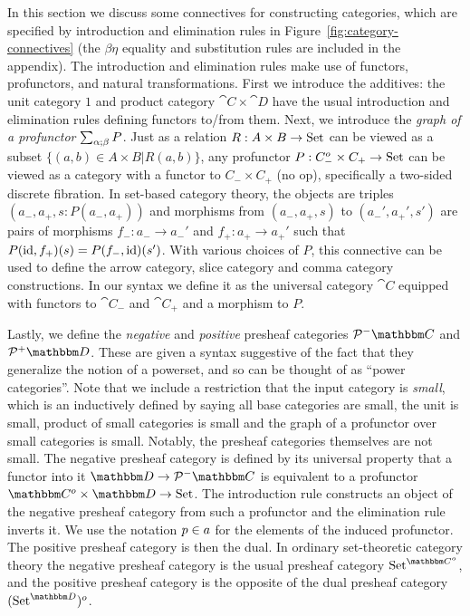 \documentclass{llncs}
\begin{document}
In this section we discuss some connectives for constructing categories,
which are specified by introduction and elimination rules in
Figure~\ref{fig:category-connectives} (the $\beta\eta$ equality and
substitution rules are included in the appendix).  The introduction and
elimination rules make use of functors, profunctors, and natural
transformations.
%
First we introduce the additives: the unit category $1$ and product
category $\cat C \times \cat D$ have the usual introduction and
elimination rules defining functors to/from them.  
%
Next, we introduce the \emph{graph of a profunctor} $\graphProf \alpha
\beta P$. Just as a relation $R : A \times B \to \Set$ can be viewed
as a subset $\{ (a,b) \in A\times B | R(a,b)\}$, any profunctor $P :
C_-^o\times C_+ \to \Set$ can be viewed as a category with a functor
to $C_- \times C_+$ (no op), specifically a two-sided discrete
fibration. In set-based category theory, the objects are triples
$(a_-, a_+, s : P(a_-,a_+))$ and morphisms from $(a_-,a_+, s)$ to
$(a_-',a_+', s')$ are pairs of morphisms $f_- : a_- \to a_-'$ and $f_+
: a_+ \to a_+'$ such that $P(\id,f_+)(s) = P(f_-,\id)(s')$.
%
With various choices of $P$, this connective can be used to define the
arrow category, slice category and comma category constructions.
%
In our syntax we define it as the universal category $\cat C$ equipped
with functors to $\cat C_-$ and $\cat C_+$ and a morphism to $P$.

Lastly, we define the \emph{negative} and \emph{positive} presheaf
categories $\negPresheaf \cat C$ and $\posPresheaf \cat D$. These are
given a syntax suggestive of the fact that they generalize the notion
of a powerset, and so can be thought of as ``power categories''.
%
Note that we include a restriction that the input category is
\emph{small}, which is an inductively defined by saying all base
categories are small, the unit is small, product of small categories
is small and the graph of a profunctor over small categories is
small. Notably, the presheaf categories themselves are not small.
%
The negative presheaf category is defined by its universal property
that a functor into it $\cat D \to \negPresheaf \cat C$ is equivalent
to a profunctor $\cat C^o \times \cat D \to \Set$.
%
The introduction rule constructs an object of the negative presheaf
category from such a profunctor and the elimination rule inverts
it. We use the notation $\negPresheafApp a p$ for the elements of the
induced profunctor.
%
The positive presheaf category is then the dual. In ordinary
set-theoretic category theory the negative presheaf category is the
usual presheaf category $\Set^{\cat C^o}$, and the positive presheaf
category is the opposite of the dual presheaf category $(\Set^{\cat
  D})^o$.
\end{document}
